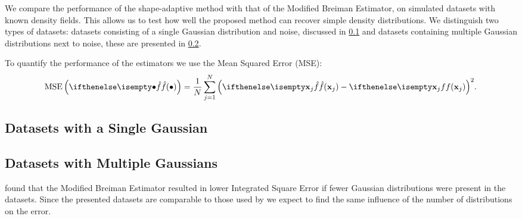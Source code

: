 We compare the performance of the shape-adaptive method with that of the Modified Breiman Estimator, on simulated datasets with known density fields. This allows us to test how well the proposed method can recover simple density distributions. We distinguish two types of datasets: datasets consisting of a single Gaussian distribution and noise, discussed in \cref{s:experiment:singlesphere} and datasets containing multiple Gaussian distributions next to noise, these are presented in \cref{s:experiment:multisphere}.

To quantify the performance of the estimators we use the Mean Squared Error (MSE):
\begin{equation*}
	\varMSE{\varEstimatedDensityFunction{\bullet}} = \frac{1}{\varNumPatterns} \sum_{\itXs = 1}^{\varNumPatterns} {\left(\varEstimatedDensityFunction{\varPattern[\itXs]} - \varDensityFunction{\varPattern[\itXs]} \right)}^2.
\end{equation*}

\subsection{Datasets with a Single Gaussian}
\label{s:experiment:singlesphere}


\subsection{Datasets with Multiple Gaussians}
\label{s:experiment:multisphere}


\textcite{ferdosi2011comparison} found that the Modified Breiman Estimator resulted in lower Integrated Square Error if fewer Gaussian distributions were present in the datasets. Since the presented datasets are comparable to those used by \citeauthor{ferdosi2011comparison} we expect to find the same influence of the number of distributions on the error.